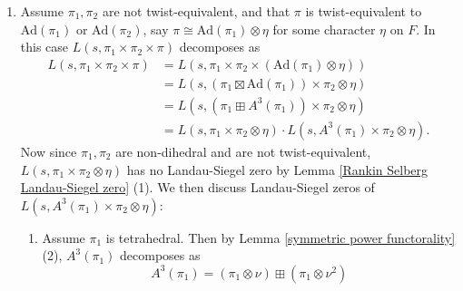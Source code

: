 \documentclass[12pt]{amsart}
\newcommand{\Ad}{\text{Ad}}
\newcommand{\Sym}{\text{Sym}}
\begin{document}
\begin{enumerate}
\begin{enumerate}
\begin{enumerate}
\begin{align*}
            \end{align*}
            Let $S$ be the set of finite places of $F$ where $\pi_1$ or $\mu$ is ramified. By \cite[Corollary 5.8]{Takeda2014}, the partial $L$-function $L^S(s,\Sym^3(\pi_1);\Sym^2\otimes \omega_1^{-3}\mu)$ is holomorphic in $(7/8,1)$. Moreover, the finite product of local $L$-functions 
            $$\prod_{v \in S}L(s,\Sym^3(\pi_{1,v});\Sym^2 \otimes \omega_{1,v}1^{-3}\mu_v) = \prod_{v \in S} \frac{L(s,A^4(\pi_{1,v}) \times \Ad(\pi_{1,v}) \otimes \mu_v)}{L(s,A^4(\pi_{1,v}) \otimes \mu_v)}$$
            is holomorphic in $(56/65,1)$ by \cite[Theorem 2]{LuoRudnickSarnak1999}.
            Thus by Lemma \ref{Landau-Siegel zero lemma}, $L(s,A^4(\pi_1) \otimes \mu)$ has no Landau-Siegel zero.
        \end{enumerate}
        We have thus eliminated Landau-Siegel zeros of $L(s,A^4(\pi_1) \otimes \mu)$ in all cases. Therefore the only possible Landau-Siegel zero of $L(s,\Ad(\pi_1) \times \Ad(\pi_3) \otimes \mu)$ comes from $L(s,\mu)$. This proves Theorem \ref{Theorem B, refined version} (1).
    \end{enumerate}
    \item Assume $\pi_1,\pi_2$ are not twist-equivalent, and that $\pi$ is twist-equivalent to $\Ad(\pi_1)$ or $\Ad(\pi_2)$, say $\pi \cong \Ad(\pi_1) \otimes \eta$ for some character $\eta$ on $F$. In this case $L(s,\pi_1 \times \pi_2 \times \pi)$ decomposes as 
    \begin{align*}
        L(s,\pi_1 \times \pi_2 \times \pi) &= L(s,\pi_1 \times \pi_2 \times (\Ad(\pi_1) \otimes \eta)) \\
        &= L(s,(\pi_1 \boxtimes \Ad(\pi_1)) \times \pi_2 \otimes \eta) \\
        &= L(s,(\pi_1 \boxplus A^3(\pi_1)) \times \pi_2 \otimes \eta) \\
        &= L(s,\pi_1 \times \pi_2 \otimes \eta) \cdot L(s,A^3(\pi_1) \times \pi_2 \otimes \eta).
    \end{align*}
    Now since $\pi_1,\pi_2$ are non-dihedral and are not twist-equivalent, $L(s,\pi_1 \times \pi_2 \otimes \eta)$ has no Landau-Siegel zero by Lemma \ref{Rankin Selberg Landau-Siegel zero} (1). We then discuss Landau-Siegel zeros of $L(s,A^3(\pi_1) \times \pi_2 \otimes \eta)$:
    \begin{enumerate}
        \item Assume $\pi_1$ is tetrahedral. Then by Lemma \ref{symmetric power functorality} (2), $A^3(\pi_1)$ decomposes as 
        $$A^3(\pi_1) = (\pi_1 \otimes \nu) \boxplus (\pi_1 \otimes \nu^2)$$

\end{enumerate}
\end{enumerate}
\end{document}
